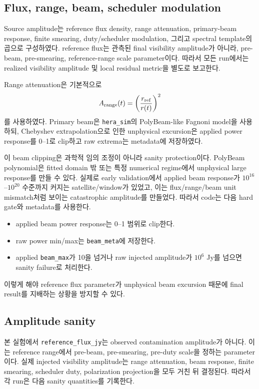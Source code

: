 \documentclass[11pt,a4paper]{article}
\begin{document}
\subsection{Flux, range, beam, scheduler modulation}

Source amplitude는 reference flux density, range attenuation, primary-beam response, finite smearing, duty/scheduler modulation, 그리고 spectral template의 곱으로 구성하였다.
reference flux는 관측된 final visibility amplitude가 아니라, pre-beam, pre-smearing, reference-range scale parameter이다.
따라서 모든 run에서는 realized visibility amplitude 및 local residual metric을 별도로 보고한다.

Range attenuation은 기본적으로
\begin{equation}
  A_{\rm range}(t)=\left(\frac{r_{\rm ref}}{r(t)}\right)^2
\end{equation}
를 사용하였다.
Primary beam은 \texttt{hera\_sim}의 PolyBeam-like Fagnoni model을 사용하되, Chebyshev extrapolation으로 인한 unphysical excursion은 applied power response를 0--1로 clip하고 raw extrema는 metadata에 저장하였다.

이 beam clipping은 과학적 임의 조정이 아니라 sanity protection이다.
PolyBeam polynomial은 fitted domain 밖 또는 특정 numerical regime에서 unphysical large response를 만들 수 있다.
실제로 early validation에서 applied beam response가 $10^{16}$--$10^{20}$ 수준까지 커지는 satellite/window가 있었고, 이는 flux/range/beam unit mismatch처럼 보이는 catastrophic amplitude를 만들었다.
따라서 code는 다음 hard gate와 metadata를 사용한다.

\begin{itemize}
  \item applied beam power response는 0--1 범위로 clip한다.
  \item raw power min/max는 \texttt{beam\_meta}에 저장한다.
  \item applied \texttt{beam\_max}가 10을 넘거나 raw injected amplitude가 $10^6$ Jy를 넘으면 sanity failure로 처리한다.
\end{itemize}

이렇게 해야 reference flux parameter가 unphysical beam excursion 때문에 final result를 지배하는 상황을 방지할 수 있다.

\subsection{Amplitude sanity}

본 실험에서 \texttt{reference\_flux\_jy}는 observed contamination amplitude가 아니다.
이는 reference range에서 pre-beam, pre-smearing, pre-duty scale을 정하는 parameter이다.
실제 injected visibility amplitude는 range attenuation, beam response, finite smearing, scheduler duty, polarization projection을 모두 거친 뒤 결정된다.
따라서 각 run은 다음 sanity quantities를 기록한다.
\end{document}
